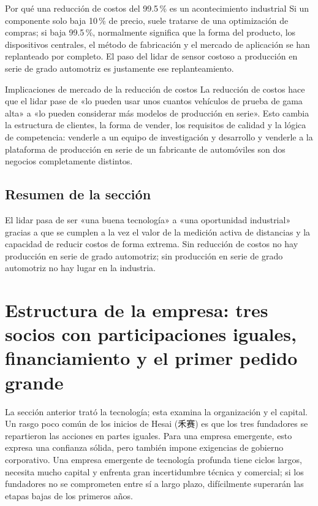 \documentclass[a4paper]{article}
\begin{document}
\begin{importantbox}{Por qué una reducción de costos del 99.5\,\% es un acontecimiento industrial}
Si un componente solo baja 10\,\% de precio, suele tratarse de una optimización de compras; si baja 99.5\,\%, normalmente significa que la forma del producto, los dispositivos centrales, el método de fabricación y el mercado de aplicación se han replanteado por completo. El paso del lidar de sensor costoso a producción en serie de grado automotriz es justamente ese replanteamiento.
\end{importantbox}

\begin{knowledgebox}{Implicaciones de mercado de la reducción de costos}
La reducción de costos hace que el lidar pase de «lo pueden usar unos cuantos vehículos de prueba de gama alta» a «lo pueden considerar más modelos de producción en serie». Esto cambia la estructura de clientes, la forma de vender, los requisitos de calidad y la lógica de competencia: venderle a un equipo de investigación y desarrollo y venderle a la plataforma de producción en serie de un fabricante de automóviles son dos negocios completamente distintos.
\end{knowledgebox}

\subsection{Resumen de la sección}

El lidar pasa de ser «una buena tecnología» a «una oportunidad industrial» gracias a que se cumplen a la vez el valor de la medición activa de distancias y la capacidad de reducir costos de forma extrema. Sin reducción de costos no hay producción en serie de grado automotriz; sin producción en serie de grado automotriz no hay lugar en la industria.
\section{Estructura de la empresa: tres socios con participaciones iguales, financiamiento y el primer pedido grande}

La sección anterior trató la tecnología; esta examina la organización y el capital. Un rasgo poco común de los inicios de Hesai (禾赛) es que los tres fundadores se repartieron las acciones en partes iguales. Para una empresa emergente, esto expresa una confianza sólida, pero también impone exigencias de gobierno corporativo. Una empresa emergente de tecnología profunda tiene ciclos largos, necesita mucho capital y enfrenta gran incertidumbre técnica y comercial; si los fundadores no se comprometen entre sí a largo plazo, difícilmente superarán las etapas bajas de los primeros años.
\end{document}

